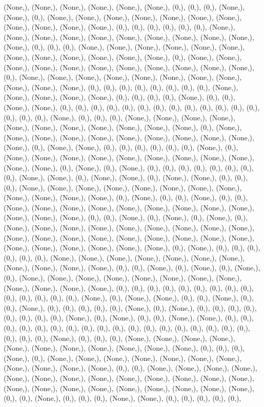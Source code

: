 \documentclass{article}
\begin{document}
(None,), (None,), (None,), (None,), (None,), (None,), (0,), (0,), (0,), (None,), (None,), (0,), (None,), (None,), (None,), (None,), (None,), (None,), (None,), (None,), (None,), (None,), (None,), (0,), (0,), (0,), (0,), (0,), (0,), (None,), (None,), (None,), (None,), (None,), (None,), (None,), (None,), (None,), (None,), (None,), (0,), (0,), (0,), (None,), (None,), (None,), (None,), (None,), (None,), (None,), (None,), (None,), (None,), (None,), (None,), (0,), (None,), (None,), (None,), (None,), (None,), (None,), (None,), (None,), (None,), (None,), (None,), (0,), (None,), (None,), (None,), (None,), (None,), (None,), (None,), (None,), (None,), (None,), (None,), (0,), (0,), (0,), (0,), (0,), (0,), (0,), (0,), (None,), (None,), (None,), (None,), (None,), (0,), (0,), (0,), (0,), (None,), (0,), (0,), (None,), (None,), (0,), (0,), (0,), (0,), (0,), (0,), (0,), (0,), (0,), (0,), (0,), (0,), (0,), (0,), (0,), (0,), (None,), (0,), (0,), (0,), (None,), (None,), (None,), (None,), (None,), (None,), (None,), (None,), (None,), (None,), (None,), (0,), (None,), (None,), (None,), (None,), (None,), (None,), (None,), (None,), (None,), (None,), (None,), (0,), (None,), (None,), (0,), (0,), (0,), (0,), (0,), (0,), (None,), (0,), (None,), (None,), (None,), (None,), (None,), (None,), (None,), (None,), (None,), (None,), (None,), (0,), (None,), (0,), (None,), (0,), (0,), (0,), (0,), (0,), (0,), (0,), (0,), (None,), (None,), (0,), (None,), (None,), (0,), (None,), (None,), (0,), (0,), (0,), (None,), (None,), (None,), (None,), (None,), (None,), (None,), (None,), (None,), (None,), (None,), (None,), (0,), (None,), (0,), (0,), (None,), (0,), (0,), (None,), (None,), (None,), (None,), (None,), (None,), (None,), (None,), (None,), (None,), (None,), (None,), (0,), (0,), (None,), (0,), (None,), (0,), (None,), (0,), (None,), (None,), (None,), (None,), (None,), (None,), (None,), (None,), (None,), (None,), (None,), (None,), (None,), (None,), (None,), (None,), (None,), (None,), (None,), (None,), (None,), (None,), (None,), (None,), (0,), (None,), (0,), (0,), (0,), (0,), (0,), (0,), (None,), (None,), (None,), (None,), (None,), (None,), (None,), (None,), (None,), (None,), (None,), (0,), (0,), (None,), (0,), (None,), (0,), (None,), (0,), (None,), (None,), (None,), (None,), (None,), (None,), (None,), (None,), (None,), (None,), (None,), (None,), (0,), (0,), (0,), (0,), (0,), (0,), (0,), (0,), (0,), (0,), (0,), (0,), (0,), (0,), (None,), (0,), (None,), (None,), (0,), (0,), (None,), (0,), (0,), (None,), (0,), (0,), (0,), (0,), (0,), (None,), (0,), (None,), (0,), (0,), (0,), (0,), (0,), (0,), (0,), (0,), (None,), (0,), (None,), (0,), (0,), (None,), (None,), (0,), (0,), (0,), (0,), (0,), (0,), (0,), (0,), (0,), (0,), (0,), (0,), (0,), (0,), (0,), (0,), (0,), (0,), (0,), (0,), (0,), (None,), (0,), (0,), (0,), (None,), (None,), (None,), (None,), (None,), (None,), (None,), (None,), (None,), (None,), (None,), (0,), (0,), (0,), (None,), (0,), (None,), (None,), (None,), (None,), (None,), (None,), (None,), (None,), (None,), (None,), (None,), (0,), (0,), (None,), (None,), (None,), (None,), (None,), (None,), (None,), (None,), (None,), (None,), (None,), (None,), (None,), (None,), (None,), (None,), (None,), (None,), (None,), (None,), (None,), (None,), (0,), (0,), (None,), (0,), (0,), (0,), (None,), (None,), (0,), (0,), (0,), (0,), (0,), 
\end{document}
